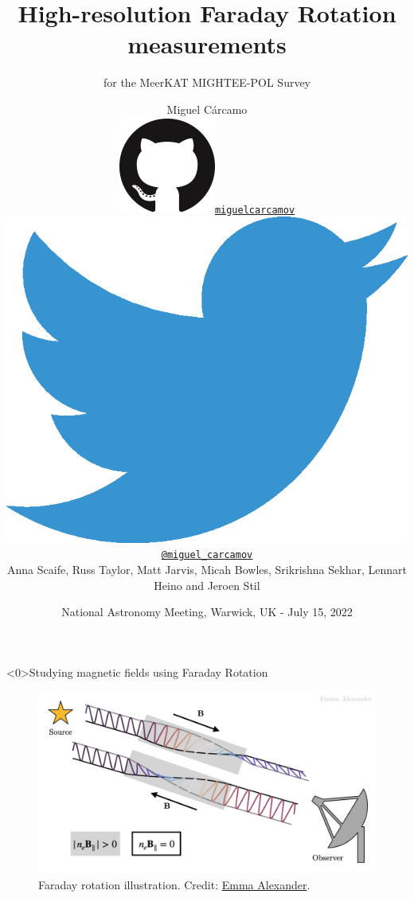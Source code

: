 \documentclass[xetex,aspectratio=169]{beamer}
\date{National Astronomy Meeting, Warwick, UK - July 15, 2022}
\title
    {High-resolution Faraday Rotation measurements}
\subtitle
    { for the MeerKAT MIGHTEE-POL Survey}
\author
    {Miguel C\'arcamo\\
    \includegraphics[scale=0.08]{figures/logos/GitHub-Mark-120px-plus.png}\hspace{0.05cm}\href{https://www.github.com/miguelcarcamov}{\tt miguelcarcamov}\\
    \includegraphics[scale=0.05]{figures/logos/2021 Twitter logo - blue.eps}\hspace{0.05cm}\href{https://www.twitter.com/miguel_carcamov}{\tt @miguel\_carcamov}\\
    \vspace{0.5cm}
    Anna Scaife, Russ Taylor, Matt Jarvis, Micah Bowles, Srikrishna Sekhar, Lennart Heino and Jeroen Stil\\
    }
\begin{document}
\frame[plain]{\titlepage}



\begin{frame}<0>{Studying magnetic fields using Faraday Rotation}
	\begin{figure}
		\centering
		\includegraphics[width=.8\textwidth]{figures/faraday_rot.png}
		\caption*{Faraday rotation illustration. Credit: \href{https://emmaalexander.github.io/resources.html}{Emma Alexander}.}
	\end{figure}
\end{frame}
\end{document}
